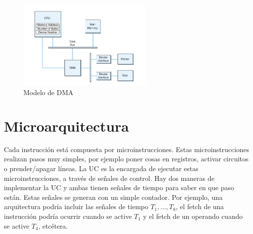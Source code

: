 \documentclass[a4paper,12pt]{article}
\begin{document}
\begin{figure}[ht!]
  \centering
   \includegraphics[width=0.6\textwidth]{Imagenes/DMA.png}
  \caption{Modelo de DMA}
  \label{DMA}
\end{figure}





\section{Microarquitectura}
Cada instrucción está compuesta por microinstrucciones. Estas microinstrucciones realizan pasos muy simples, por
ejemplo poner cosas en registros, activar circuitos o prender/apagar líneas. La UC es la encargada de ejecutar
estas microinstrucciones, a través de señales de control. Hay dos maneras de implementar la UC y ambas
tienen señales de tiempo para saber en que paso están. Estas señales se generan con un simple contador. Por ejemplo,
una arquitectura podría incluir las señales de tiempo $T_1,...,T_8$, el fetch de una instrucción podría ocurrir cuando
se active $T_1$ y el fetch de un operando cuando se active $T_4$, etcétera.
\end{document}
